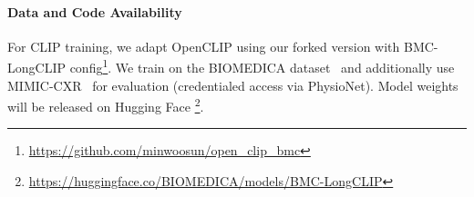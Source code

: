 \paragraph*{Data and Code Availability}



For CLIP training, we adapt OpenCLIP using our forked version with BMC-LongCLIP config\footnote{\url{https://github.com/minwoosun/open_clip_bmc}}. 
We train on the BIOMEDICA dataset~\cite{lozano2025biomedica} and additionally use MIMIC-CXR~\cite{mimic} 
for evaluation (credentialed access via PhysioNet). Model weights will be released on Hugging Face \footnote{\url{https://huggingface.co/BIOMEDICA/models/BMC-LongCLIP}}.






